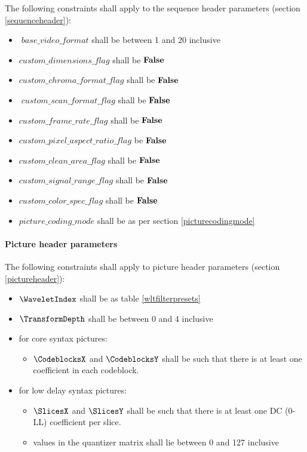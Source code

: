 The following constraints shall apply to the sequence header parameters
(section \ref{sequenceheader}):
\begin{itemize}
\item$base\_video\_format$ shall be between 1 and 20 inclusive
\item $custom\_dimensions\_flag$ shall be $\text{\bf{False}}$
\item $custom\_chroma\_format\_flag$ shall be $\text{\bf{False}}$
\item$custom\_scan\_format\_flag$ shall be $\text{\bf{False}}$
\item $custom\_frame\_rate\_flag$ shall be $\text{\bf{False}}$
\item $custom\_pixel\_aspect\_ratio\_flag$ be $\text{\bf{False}}$
\item $custom\_clean\_area\_flag$ shall be $\text{\bf{False}}$
\item $custom\_signal\_range\_flag$ shall be $\text{\bf{False}}$
\item $custom\_color\_spec\_flag$ shall be $\text{\bf{False}}$
\item $picture\_coding\_mode$ shall be as per section \ref{picturecodingmode}
\end{itemize}

\paragraph{Picture header parameters\newline}

The following constraints shall apply to picture header parameters
(section \ref{pictureheader}):
\begin{itemize}
\item $\WaveletIndex$ shall be as table \ref{wltfilterpresets}
\item $\TransformDepth$ shall be between 0 and 4 inclusive
\item for core syntax pictures:
    \begin{itemize}
    \item $\CodeblocksX$ and $\CodeblocksY$ shall be such that there is 
    at least one coefficient in each codeblock.
    \end{itemize}
\item for low delay syntax pictures:
    \begin{itemize}
    \item $\SlicesX$ and $\SlicesY$ shall be such that there is at least one 
    DC (0-LL) coefficient per slice.
    \item values in the quantizer matrix shall lie between 0 and 127 inclusive
    \end{itemize}
\end{itemize}

